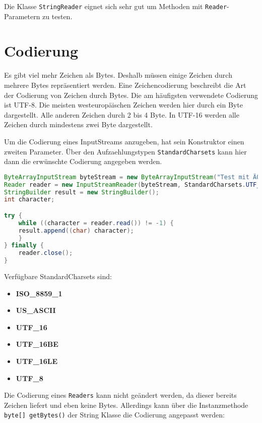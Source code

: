 Die Klasse \lstinline{StringReader} eignet sich sehr gut um Methoden mit \lstinline{Reader}-Parametern
zu testen.

\section{Codierung}

Es gibt viel mehr Zeichen als Bytes. Deshalb müssen einige Zeichen durch
mehrere Bytes repräsentiert werden. Eine Zeichencodierung beschreibt die Art
der Codierung von Zeichen durch Bytes. Die am häufigsten verwendete Codierung
ist UTF-8. Die meisten westeuropäischen Zeichen werden hier durch ein Byte
dargestellt. Alle anderen Zeichen durch 2 bis 4 Byte. In UTF-16 werden alle
Zeichen durch mindestens zwei Byte dargestellt.

Um die Codierung eines InputStreams anzugeben, hat sein Konstruktor einen
zweiten Parameter. Über den Aufzaehlungstypen
\lstinline{StandardCharsets} kann hier dann die erwünschte Codierung angegeben
werden.

\begin{lstlisting}[language=Java, caption={Beispiel für Codierten InputStream}]
ByteArrayInputStream byteStream = new ByteArrayInputStream("Test mit ÄÖÜ".getBytes(StandardCharsets.UTF_8));
Reader reader = new InputStreamReader(byteStream, StandardCharsets.UTF_8);
StringBuilder result = new StringBuilder();
int character;

try {
    while ((character = reader.read()) != -1) {
    result.append((char) character);
    }
} finally {
    reader.close();
}
\end{lstlisting}

Verfügbare StandardCharsets sind:

\begin{itemize}
    \item \textbf{ISO\_8859\_1}
    \item \textbf{US\_ASCII}
    \item \textbf{UTF\_16}
    \item \textbf{UTF\_16BE}
    \item \textbf{UTF\_16LE}
    \item \textbf{UTF\_8}
\end{itemize}

Die Codierung eines \lstinline{Readers} kann nicht geändert werden, da dieser
bereits Zeichen liefert und eben keine Bytes. Allerdings kann über die
Instanzmethode \lstinline{byte[] getBytes()} der String Klasse die Codierung
angepasst werden:


